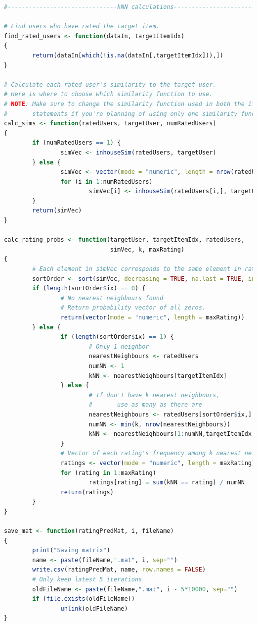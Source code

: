 \documentclass{article}
\begin{document}
\begin{lstlisting}[language=R]
#-------------------------------kNN calculations-------------------------------

# Find users who have rated the target item.
find_rated_users <- function(dataIn, targetItemIdx)
{
        return(dataIn[which(!is.na(dataIn[,targetItemIdx])),])
}

# Calculate each rated user's similarity to the target user.
# Here is where to choose which similarity function to use.
# NOTE: Make sure to change the similarity function used in both the if and the else
#       statements if you're planning of using only one similarity function
calc_sims <- function(ratedUsers, targetUser, numRatedUsers)
{
        if (numRatedUsers == 1) {
                simVec <- inhouseSim(ratedUsers, targetUser)
        } else {
                simVec <- vector(mode = "numeric", length = nrow(ratedUsers))
                for (i in 1:numRatedUsers)
                        simVec[i] <- inhouseSim(ratedUsers[i,], targetUser)
        }
        return(simVec)
}

calc_rating_probs <- function(targetUser, targetItemIdx, ratedUsers,
                              simVec, k, maxRating)
{
        # Each element in simVec corresponds to the same element in ratedUsers
        sortOrder <- sort(simVec, decreasing = TRUE, na.last = TRUE, index.return = TRUE)
        if (length(sortOrder$ix) == 0) {
                # No nearest neighbours found
                # Return probability vector of all zeros.
                return(vector(mode = "numeric", length = maxRating))
        } else {
                if (length(sortOrder$ix) == 1) {
                        # Only 1 neighbor
                        nearestNeighbours <- ratedUsers
                        numNN <- 1
                        kNN <- nearestNeighbours[targetItemIdx]
                } else {
                        # If don't have k nearest neighbours,
                        #       use as many as there are
                        nearestNeighbours <- ratedUsers[sortOrder$ix,]
                        numNN <- min(k, nrow(nearestNeighbours))
                        kNN <- nearestNeighbours[1:numNN,targetItemIdx]
                }
                # Vector of each rating's frequency among k nearest neighbours
                ratings <- vector(mode = "numeric", length = maxRating)
                for (rating in 1:maxRating)
                        ratings[rating] = sum(kNN == rating) / numNN
                return(ratings)
        }
}

save_mat <- function(ratingPredMat, i, fileName)
{
        print("Saving matrix")
        name <- paste(fileName,".mat", i, sep="")
        write.csv(ratingPredMat, name, row.names = FALSE)
        # Only keep latest 5 iterations
        oldFileName <- paste(fileName,".mat", i - 5*10000, sep="")
        if (file.exists(oldFileName))
                unlink(oldFileName)
}


\end{lstlisting}
\end{document}
